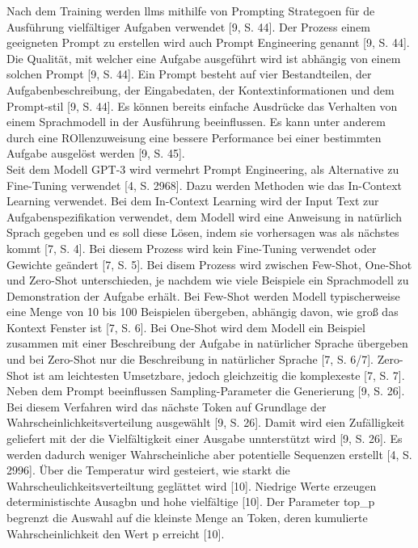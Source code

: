 Nach dem Training werden \acp{llm} mithilfe von Prompting Strategoen für de Ausführung vielfältiger Aufgaben verwendet [9, S. 44]. Der Prozess einem geeigneten 
Prompt zu erstellen wird auch Prompt Engineering genannt [9, S. 44]. Die Qualität, mit welcher eine Aufgabe ausgeführt wird ist abhängig von einem solchen 
Prompt [9, S. 44]. Ein Prompt besteht auf vier Bestandteilen, der Aufgabenbeschreibung, der Eingabedaten, der Kontextinformationen und dem Prompt-stil [9, S. 44].
Es können bereits einfache Ausdrücke das Verhalten von einem Sprachmodell in der Ausführung beeinflussen. Es kann unter anderem durch eine ROllenzuweisung 
eine bessere Performance bei einer bestimmten Aufgabe ausgelöst werden [9, S. 45]. \\
Seit dem Modell GPT-3 wird vermehrt Prompt Engineering, als Alternative zu Fine-Tuning verwendet [4, S. 2968]. Dazu werden Methoden wie das In-Context Learning 
verwendet. Bei dem In-Context Learning wird der Input Text zur Aufgabenspezifikation verwendet, dem Modell wird eine Anweisung in natürlich Sprach gegeben und 
es soll diese Lösen, indem sie vorhersagen was als nächstes kommt [7, S. 4]. Bei diesem Prozess wird kein Fine-Tuning verwendet oder Gewichte geändert [7, S. 5].
Bei disem Prozess wird zwischen Few-Shot, One-Shot und Zero-Shot unterschieden, je nachdem wie viele Beispiele ein Sprachmodell zu Demonstration der Aufgabe
erhält. Bei Few-Shot werden Modell typischerweise eine Menge von 10 bis 100 Beispielen übergeben, abhängig davon, wie groß das Kontext Fenster ist [7, S. 6].
Bei One-Shot wird dem Modell ein Beispiel zusammen mit einer Beschreibung der Aufgabe in natürlicher Sprache übergeben und bei Zero-Shot nur die Beschreibung in 
natürlicher Sprache [7, S. 6/7]. Zero-Shot ist am leichtesten Umsetzbare, jedoch gleichzeitig die komplexeste [7, S. 7]. \\
Neben dem Prompt beeinflussen Sampling-Parameter die Generierung [9, S. 26]. Bei diesem Verfahren wird das nächste Token auf Grundlage der 
Wahrscheinlichkeitsverteilung ausgewählt [9, S. 26]. Damit wird eien Zufälligkeit geliefert mit der die Vielfältigkeit einer Ausgabe unnterstützt wird [9, S. 26].
Es werden dadurch weniger Wahrscheinliche aber potentielle Sequenzen erstellt [4, S. 2996]. 
Über die Temperatur wird gesteiert, wie starkt die Wahrscheulichkeitsverteiltung geglättet wird [10]. Niedrige Werte erzeugen deterministischte Ausagbn und 
hohe vielfältige [10]. Der Parameter top\_p begrenzt die Auswahl auf die kleinste Menge an Token, deren kumulierte Wahrscheinlichkeit den Wert p
erreicht [10].

